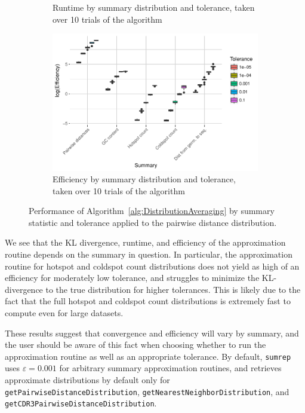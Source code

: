 \documentclass{article}
\begin{document}
\begin{figure}
\begin{subfigure}{0.5\textwidth}
        \caption{Runtime by summary distribution and tolerance, taken over 10 trials of the algorithm}
        \label{fig:TimeBySummary}
    \end{subfigure}
    \begin{subfigure}{0.5\textwidth}
        \includegraphics[width=\linewidth]{Figures/Multiple/efficiency_by_summary_and_tol.pdf}
        \caption{Efficiency by summary distribution and tolerance, taken over 10 trials of the algorithm}
        \label{fig:EfficiencyBySummary}
    \end{subfigure}
    \caption{Performance of Algorithm~\ref{alg:DistributionAveraging} by summary statistic and tolerance applied to the pairwise distance distribution.}
\end{figure}
We see that the KL divergence, runtime, and efficiency of the approximation routine depends on the summary in question.
In particular, the approximation routine for hotspot and coldspot count distributions does not yield as high of an efficiency for moderately low tolerance, and struggles to minimize the KL-divergence to the true distribution for higher tolerances.
This is likely due to the fact that the full hotspot and coldspot count distributions is extremely fast to compute even for large datasets.

These results suggest that convergence and efficiency will vary by summary, and the user should be aware of this fact when choosing whether to run the approximation routine as well as an appropriate tolerance.
By default, \texttt{sumrep} uses $\varepsilon = 0.001$ for arbitrary summary approximation routines, and retrieves approximate distributions by default only for \texttt{getPairwiseDistanceDistribution}, \texttt{getNearestNeighborDistribution}, and \texttt{getCDR3PairwiseDistanceDistribution}.
\end{document}
